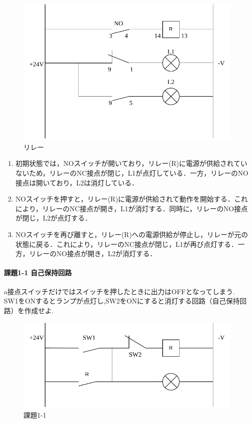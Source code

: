 \begin{figure}[H]
  \centering
  \includegraphics[scale=0.5]{sozai/1_compressed.pdf}
  \caption{リレー}
\end{figure}

\begin{enumerate}
  \item 初期状態では，NOスイッチが開いており，リレー(R)に電源が供給されていないため，リレーのNC接点が閉じ，L1が点灯している．一方，リレーのNO接点は開いており，L2は消灯している．
  \item NOスイッチを押すと，リレー(R)に電源が供給されて動作を開始する．これにより，リレーのNC接点が開き，L1が消灯する．同時に，リレーのNO接点が閉じ，L2が点灯する．
  \item NOスイッチを再び離すと，リレー(R)への電源供給が停止し，リレーが元の状態に戻る．これにより，リレーのNC接点が閉じ，L1が再び点灯する．一方，リレーのNO接点が開き，L2が消灯する．
\end{enumerate}


\paragraph{課題1-1 自己保持回路}
a接点スイッチだけではスイッチを押したときに出力はOFFとなってしまう.
SW1をONするとランプが点灯し,SW2をONにすると消灯する回路（自己保持回路）を作成せよ.\\

\begin{figure}[H]
  \centering
  \includegraphics[scale=0.7]{sozai/14.pdf}
  \caption{課題1-1}
\end{figure}


